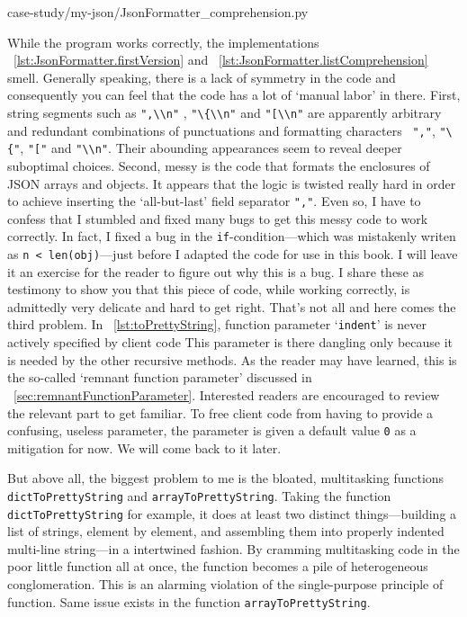 \documentclass[oneside,11pt]{book}
\theoremstyle{definition}
\theoremstyle{remark}
\newcommand{\code}[1]{\mbox{\lstinline{#1}}}
\begin{document}

{case-study/my-json/JsonFormatter_comprehension.py}

While the program works correctly,
the implementations ~\autoref{lst:JsonFormatter.firstVersion} and
~\autoref{lst:JsonFormatter.listComprehension} smell.
Generally speaking, there is a lack of symmetry in the code and consequently
you can feel that the code has a lot of `manual labor' in there.
First, string segments such as \code{",\\n"} , \code{"\{\\n"} and
\code{"[\\n"} are apparently arbitrary and redundant combinations of
punctuations and formatting characters
\ \code{","}, \code{"\{"}, \code{"["} and \code{"\\n"}.
Their abounding appearances seem to reveal deeper suboptimal choices.
Second, messy is the code that formats the enclosures of JSON arrays and objects.
It appears that the logic is
twisted really hard in order to achieve inserting the `all-but-last' field separator \code{","}.
Even so, I have to confess that I stumbled and fixed many bugs to get this messy code to work
correctly.
In fact, I fixed a bug in the \code{if}-condition---which was
mistakenly writen as \code{n < len(obj)}---just before I adapted the code for use in this book.
I will leave it an exercise for the reader to figure out why this is a bug.
I share these as testimony to show you that
this piece of code, while working correctly, is admittedly very delicate and hard to get right.
That's not all and here comes the third problem.
In ~\autoref{lst:toPrettyString}, function parameter `\code{indent}' is
never actively specified by client code
This parameter is there dangling only because it is needed by the other recursive methods.
As the reader may have learned, this is the so-called `remnant function parameter' discussed
in ~\autoref{sec:remnantFunctionParameter}.
Interested readers are encouraged to review the relevant part to get familiar.
To free client code from having to provide a confusing, useless parameter,
the parameter is given a default value \code{0} as a mitigation for now.
We will come back to it later.

But above all, the biggest problem to me is the bloated, multitasking functions
\code{dictToPrettyString} and \code{arrayToPrettyString}.
Taking the function \code{dictToPrettyString} for example,
it does at least two distinct
things---building a list of strings, element by element, and assembling
them into properly indented multi-line string---in a intertwined fashion.
By cramming multitasking code in the poor little function all at once,
the function becomes a pile of heterogeneous conglomeration.
This is an alarming violation of the single-purpose principle of function.
Same issue exists in the function \code{arrayToPrettyString}.
\end{document}
